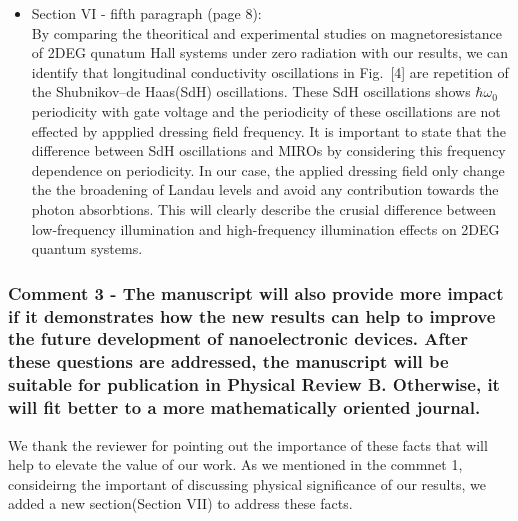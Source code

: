 \documentclass{article}
\begin{document}
\begin{itemize}
{  }
  \item Section VI - fifth paragraph (page 8):\\
  {\color{Maroon}
  By comparing the theoritical \cite{ando72,ando74_1,ando74_2,ando74_3,ando74_4,ando82,endo09} and experimental \cite{endo09,wakabayashi78} studies on magnetoresistance of 2DEG qunatum Hall systems under zero radiation with our results, we can identify that longitudinal conductivity oscillations in Fig.~[4] are repetition of the Shubnikov–de Haas(SdH) oscillations.
  These SdH oscillations shows $\hbar\omega_0$ periodicity with gate voltage and the periodicity of these oscillations are not effected by appplied dressing field frequency. It is important to state that the difference between SdH oscillations and MIROs \cite{zudov01,mani02,zudov03,mani04} by considering this frequency dependence on periodicity. In our case, the applied dressing field only change the the broadening of Landau levels and avoid any contribution towards the photon absorbtions. This will clearly describe the crusial difference between low-frequency illumination and high-frequency illumination effects on 2DEG quantum systems.
  }
\end{itemize}

\subsubsection*{Comment 3 -
\color{RoyalBlue} The manuscript will also provide more impact if it demonstrates how the new results can help to improve the future development of nanoelectronic devices. After these questions are addressed, the manuscript will be suitable for publication in Physical Review B. Otherwise, it will fit better to a more mathematically oriented journal.
}

We thank the reviewer for pointing out the importance of these facts that will help to elevate the value of our work. As we mentioned in the commnet 1, consideirng the important of discussing physical significance of our results, we added a new section(Section VII) to address these facts.
\end{document}
